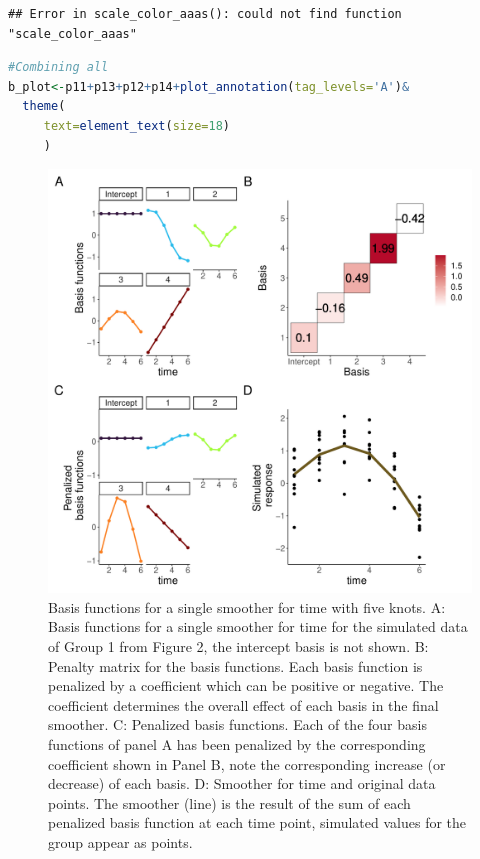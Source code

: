 \documentclass[
]{article}
\begin{document}
\begin{lstlisting}
## Error in scale_color_aaas(): could not find function "scale_color_aaas"
\end{lstlisting}

\begin{lstlisting}[language=R]
#Combining all
b_plot<-p11+p13+p12+p14+plot_annotation(tag_levels='A')&
  theme(
     text=element_text(size=18)
     )
\end{lstlisting}



\begin{figure}[H]

{\centering \includegraphics[width=0.75\linewidth,]{Full_document_files/figure-latex/basis-plot-appendix-1} 

}

\caption{Basis functions for a single smoother for time with five knots. A: Basis functions for a single smoother for time for the simulated data of Group 1 from Figure 2, the intercept basis is not shown. B: Penalty matrix for the basis functions. Each basis function is penalized by a coefficient which can be positive or negative. The coefficient determines the overall effect of each basis in the final smoother. C: Penalized basis functions. Each of the four basis functions of panel A has been penalized by the corresponding coefficient shown in Panel B, note the corresponding increase (or decrease) of each basis. D: Smoother for time and original data points. The smoother (line) is the result of the sum of each penalized basis function at each time point, simulated values for the group appear as points.}\label{fig:basis-plot-appendix}
\end{figure}
\end{document}

